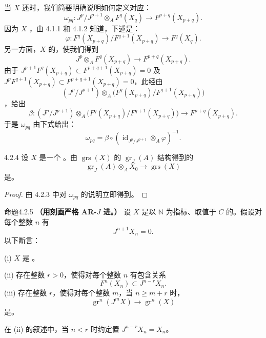 当 $X$ 还时，我们简要明确说明如何定义对应：
\[
\omega_{pq}:J^p/J^{p+1}\otimes_A F^q(X_q)\longrightarrow F^{p+q}(X_{p+q}).
\]
因为 $X$ ，由 4.1.1 和 4.1.2 知道，下述是：
\[
\varphi:F^q(X_{p+q})/F^{q+1}(X_{p+q})\longrightarrow F^q(X_q).
\]
另一方面，$X$ 的，使我们得到
\[
J^p\otimes_A F^q(X_{p+q})\longrightarrow F^{p+q}(X_{p+q}).
\]
由于 $J^{p+1}F^q(X_{p+q})\subset F^{p+q+1}(X_{p+q})=0$ 及 $J^pF^{q+1}(X_{p+q})\subset F^{p+q+1}(X_{p+q})=0$，此经由
\[
(J^p/J^{p+1})\otimes_A\bigl(F^q(X_{p+q})/F^{q+1}(X_{p+q})\bigr)
\]
，给出
\[
\beta:(J^p/J^{p+1})\otimes_A\bigl(F^q(X_{p+q})/F^{q+1}(X_{p+q})\bigr)\longrightarrow F^{p+q}(X_{p+q}).
\]
于是 $\omega_{pq}$ 由下式给出：
\[
\omega_{pq}=\beta\circ(\operatorname{id}_{J^p/J^{p+1}}\otimes_A\varphi)^{-1}.
\]
\begin{SGAresult}{}{4.2.4}
设 $X$ 是一个 。由 $\operatorname{grs}(X)$ 的 $\operatorname{gr}_J(A)$ 结构得到的
\[
\operatorname{gr}_J(A)\otimes_A X_0\longrightarrow\operatorname{grs}(X)
\]
是。
\end{SGAresult}
\begin{proof}由 4.2.3 中对 $\omega_{pq}$ 的说明立即得到。\end{proof}
\begin{SGAresult}{命题}{4.2.5}
\textbf{（用刻画严格 AR-$J$ 进。）}
设 $X$ 是以 $\mathbb N$ 为指标、取值于 $C$ 的。假设对每个整数 $n$ 有
\[
J^{n+1}X_n=0.
\]
以下断言：

(i) $X$ 是 。

(ii) 存在整数 $r>0$，使得对每个整数 $n$ 有包含关系
\[
F^n(X_n)\subset J^{n-r}X_n.
\]
(iii) 存在整数 $r$，使得对每个整数 $m$，当 $n\geq m+r$ 时，
\[
\operatorname{gr}^n(J^mX)\longrightarrow\operatorname{gr}^n(X)
\]
是。

在 (ii) 的叙述中，当 $n<r$ 时约定置 $J^{n-r}X_n=X_n$。
\end{SGAresult}
